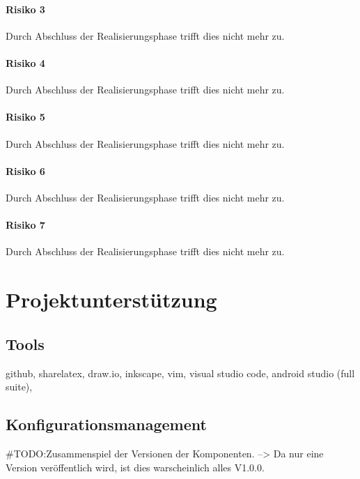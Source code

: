\paragraph{Risiko 3}
Durch Abschluss der Realisierungsphase trifft dies nicht mehr zu.
\paragraph{Risiko 4}
Durch Abschluss der Realisierungsphase trifft dies nicht mehr zu.
\paragraph{Risiko 5}
Durch Abschluss der Realisierungsphase trifft dies nicht mehr zu.
\paragraph{Risiko 6}
Durch Abschluss der Realisierungsphase trifft dies nicht mehr zu.
\paragraph{Risiko 7}
Durch Abschluss der Realisierungsphase trifft dies nicht mehr zu.

\section{Projektunterstützung}
\subsection{Tools}
github, sharelatex, draw.io, inkscape, vim, visual studio code, android studio (full suite), 

\subsection{Konfigurationsmanagement}
\#TODO:Zusammenspiel der Versionen der Komponenten. --> Da nur eine Version veröffentlich wird, ist dies warscheinlich alles V1.0.0.